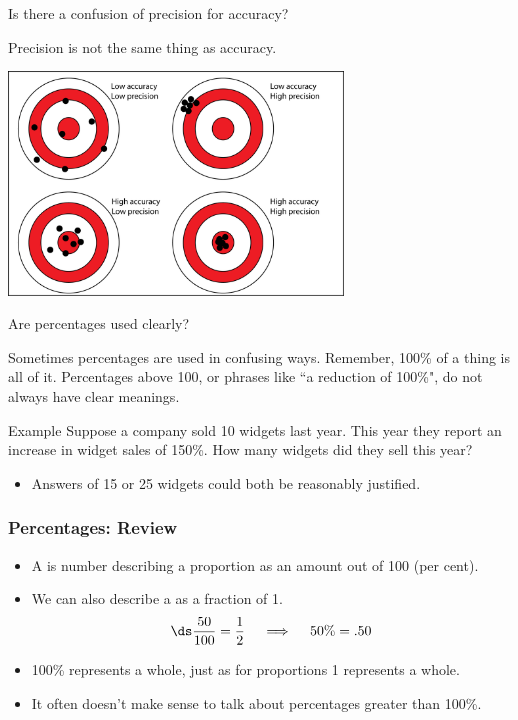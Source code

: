 \documentclass[xcolor=table, aspectratio=169, bigger]{beamer}
\begin{document}
\begin{frame}{Is there a confusion of precision for accuracy?}

\begin{block}{}
Precision is not the same thing as accuracy.
\end{block}

\begin{center}
\includegraphics[width=3.5in]{../images/precision_accuracy}
\end{center}
\end{frame}

\begin{frame}{Are percentages used clearly?}

\begin{block}{}
Sometimes percentages are used in confusing ways. Remember, 100\% of a thing is all of it. Percentages above 100, or phrases like ``a reduction of 100\%", do not always have clear meanings. 
\end{block}

\begin{exampleblock}{Example}
Suppose a company sold 10 widgets last year. This year they report an increase in widget sales of 150\%. How many widgets did they sell this year?
\begin{itemize}
\item Answers of 15 or 25 widgets could both be reasonably justified. 
\end{itemize}
\end{exampleblock}

\end{frame}

\begin{frame}
\frametitle{Percentages: Review}

\begin{block}{}
\begin{itemize}
\item A  is number describing a proportion as an amount out of 100 (per cent).
\pause
\item We can also describe a  as a fraction of 1.
\[\ds \frac {50}{100} = \frac 1 2 \quad \implies \quad 50\% = .50\]
\pause
\item 100\% represents a whole, just as for proportions 1 represents a whole.
\pause
\item It often doesn't make sense to talk about percentages greater than 100\%.
\end{itemize}
\end{block}
\end{frame}
\end{document}

